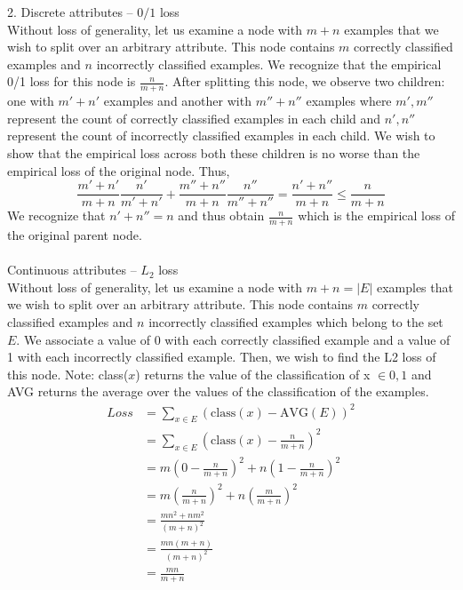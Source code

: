\documentclass{article}
\begin{document}
2.
Discrete attributes -- \(0/1\) loss\\
Without loss of generality, let us examine a node with \(m + n\) examples that we wish to split over an arbitrary attribute. This node contains \(m\) correctly classified examples and \(n\) incorrectly classified examples. We recognize that the empirical 0/1 loss for this node is \(\frac{n}{m+n}\). After splitting this node, we observe two children: one with \(m'+n'\) examples and another with \(m''+n''\) examples where \(m',m''\) represent the count of correctly classified examples in each child and \(n',n''\) represent the count of incorrectly classified examples in each child. We wish to show that the empirical loss across both these children is no worse than the empirical loss of the original node. Thus,
\begin{equation*}
\frac{m'+n'}{m+n}\frac{n'}{m'+n'} + \frac{m''+n''}{m+n}\frac{n''}{m''+n''} = \frac{n' + n''}{m+n} \leq \frac{n}{m+n}
\end{equation*}
We recognize that \(n' + n'' = n\) and thus obtain \(\frac{n}{m+n}\) which is the empirical loss of the original parent node. 
\\\\
Continuous attributes -- \(L_2\) loss\\
Without loss of generality, let us examine a node with \(m + n = |{E}|\) examples that we wish to split over an arbitrary attribute. This node contains \(m\) correctly classified examples and \(n\) incorrectly classified examples which belong to the set \(E\). We associate a value of 0 with each correctly classified example and a value of 1 with each incorrectly classified example. Then, we wish to find the L2 loss of this node. Note: class(\(x\)) returns the value of the classification of x \(\in {0,1}\) and AVG returns the average over the values of the classification of the examples.
\begin{align*}
Loss &= \sum_{x \in E}(\mathrm{class}(x) - \mathrm{AVG}(E))^2\\
&= \sum_{x \in E}(\mathrm{class}(x) - \frac{n}{m+n})^2\\
&= m\left(0 - \frac{n}{m+n}\right)^2 + n\left(1-\frac{n}{m+n}\right)^2\\
&= m\left(\frac{n}{m+n}\right)^2 + n\left(\frac{m}{m+n}\right)^2\\
&= \frac{mn^2 + nm^2}{(m+n)^2}\\
&= \frac{mn(m+n)}{(m+n)^2}\\
&= \frac{mn}{m+n}
\end{align*}
\end{document}
